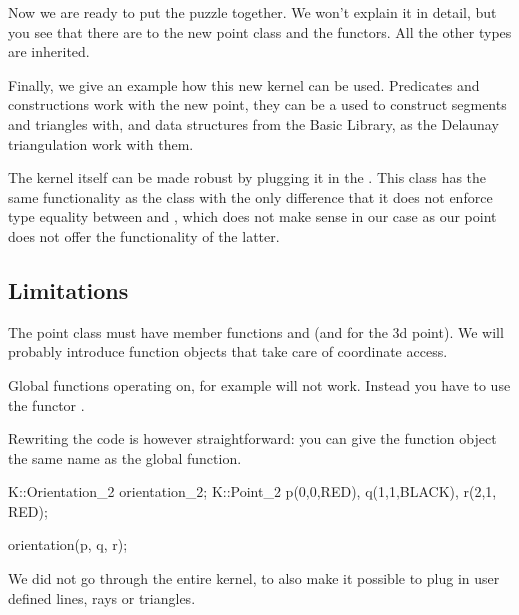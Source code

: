 Now we are ready to put the puzzle together. We won't explain it in
detail, but you see that there are  to the new point
class and the functors. All the other types are inherited.



\ccHtmlLinksOff


\ccHtmlLinksOn



Finally, we give an example how this new kernel can be used.
Predicates and constructions work with the new point, they
can be a used to construct segments and triangles with, and
data structures from the Basic Library, as the Delaunay
triangulation work with them.  

The kernel itself can be
made robust by plugging it in the .
This class has the same functionality as the class 
with the only difference that it does not enforce type equality
between  and , which
does not make sense in our case as our point does not offer
the functionality of the latter.


\ccHtmlLinksOff
{}
\ccHtmlLinksOn


\subsection{Limitations}

The point class must have member functions  and 
(and  for the 3d point). We will probably
introduce function objects that take care of coordinate
access.

Global functions operating on, for example
 will not work. 
Instead you have to use the functor .

Rewriting the code is however straightforward: you can give
the function object the same name as the global function.

\ccHtmlLinksOff
\begin{ccExampleCode}

K::Orientation_2 orientation_2;
K::Point_2 p(0,0,RED), q(1,1,BLACK), r(2,1, RED);

orientation(p, q, r);

\end{ccExampleCode}
\ccHtmlLinksOn

We did not go through the entire kernel, to also make
it possible to plug in user defined lines, rays or triangles.







